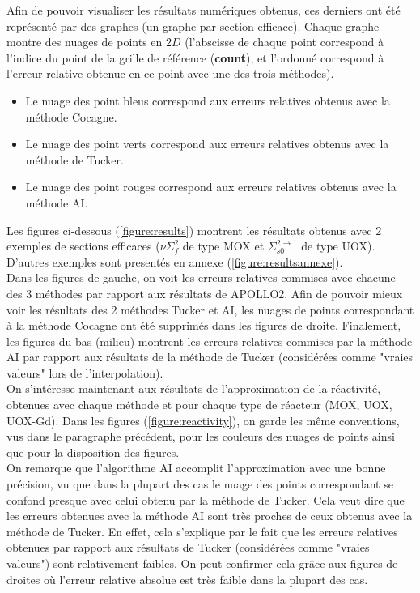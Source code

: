 Afin de pouvoir visualiser les résultats numériques obtenus, ces derniers ont été représenté par des graphes (un graphe par section efficace). Chaque graphe montre des nuages de points en $2D$ (l'abscisse de chaque point correspond à l'indice du point de la grille de référence (\textbf{count}), et l'ordonné correspond à l'erreur relative obtenue en ce point avec une des trois méthodes).
\begin{itemize}
\item Le nuage des point bleus correspond aux erreurs relatives obtenus avec la méthode Cocagne.
\item Le nuage des point verts correspond aux erreurs relatives obtenus avec la méthode de Tucker.
\item Le nuage des point rouges correspond aux erreurs relatives obtenus avec la méthode AI.
\end{itemize}
\hspace{0.5cm} Les figures ci-dessous (\ref{figure:results}) montrent les résultats obtenus avec 2 exemples de sections efficaces ($\nu\Sigma_f^2$ de type MOX et $\Sigma_{s0}^{2\rightarrow1}$ de type UOX). D'autres exemples sont presentés en annexe (\ref{figure:resultsannexe}).\\
Dans les figures de gauche, on voit les erreurs relatives commises avec chacune des 3 méthodes par rapport aux résultats de APOLLO2. Afin de pouvoir mieux voir les résultats des 2 méthodes Tucker et AI, les nuages de points correspondant à la méthode Cocagne ont été supprimés dans les figures de droite. Finalement, les figures du bas (milieu) montrent les erreurs relatives commises par la méthode AI par rapport aux résultats de la méthode de Tucker (considérées comme "vraies valeurs" lors de l'interpolation).\\
\hspace{0.5cm} On s'intéresse maintenant aux résultats de l'approximation de la réactivité, obtenues avec chaque méthode et pour chaque type de réacteur (MOX, UOX, UOX-Gd). Dans les figures (\ref{figure:reactivity}), on garde les même conventions, vus dans le paragraphe précédent, pour les couleurs des nuages de points ainsi que pour la disposition des figures.\\

\hspace{0.5cm} On remarque que l'algorithme AI accomplit l'approximation avec une bonne précision, vu que dans la plupart des cas le nuage des points correspondant se confond presque avec celui obtenu par la méthode de Tucker. Cela veut dire que les erreurs obtenues avec la méthode AI sont très proches de ceux obtenus avec la méthode de Tucker. En effet, cela s'explique par le fait que les erreurs relatives obtenues par rapport aux résultats de Tucker (considérées comme "vraies valeurs") sont relativement faibles. On peut confirmer cela grâce aux figures de droites où l'erreur relative absolue est très faible dans la plupart des cas.\\

